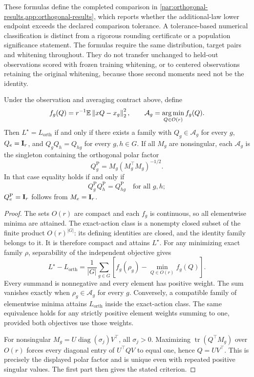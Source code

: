 These formulas define the completed comparison in \cref{par:orthogonal-results,app:orthogonal-results}, which reports whether the additional-law lower endpoint exceeds the declared comparison tolerance. A tolerance-based numerical classification is distinct from a rigorous rounding certificate or a population significance statement. The formulas require the same distribution, target pairs and whitening throughout. They do not transfer unchanged to held-out observations scored with frozen training whitening, or to centered observations retaining the original whitening, because those second moments need not be the identity.

\begin{proposition}
\label{sp:orthogonal-compatibility}
Under the observation and averaging contract above, define
\[
 f_g(Q)=r^{-1}\mathbb E\left\lVert xQ-x_g\right\rVert_2^2,
 \qquad \mathcal A_g=\operatorname*{arg\,min}_{Q\in O(r)}f_g(Q).
\]
Then $L^\star=L_{\mathrm{orth}}$ if and only if there exists a family with
$Q_g\in\mathcal A_g$ for every $g$, $Q_e=\mathbf{I}_r$, and
$Q_gQ_h=Q_{hg}$ for every $g,h\in G$.
If all $M_g$ are nonsingular, each $\mathcal A_g$ is the singleton containing the orthogonal polar factor
\[
 Q_g^{\mathrm P}=M_g(M_g^\top M_g)^{-1/2}.
\]
In that case equality holds if and only if
\[
 Q_g^{\mathrm P}Q_h^{\mathrm P}
 =
 Q_{hg}^{\mathrm P}
 \quad\text{for all }g,h;
\]
$Q_e^{\mathrm P}=\mathbf{I}_r$ follows from $M_e=\mathbf{I}_r$.
\end{proposition}

\begin{proof}
The sets $O(r)$ are compact and each $f_g$ is continuous, so all elementwise minima are attained. The exact-action class is a nonempty closed subset of the finite product $O(r)^{|G|}$: its defining identities are closed, and the identity family belongs to it. It is therefore compact and attains $L^\star$. For any minimizing exact family $\rho$, separability of the independent objective gives
\[
 L^\star-L_{\mathrm{orth}}
 =\frac1{|G|}\sum_{g\in G}
 \left[f_g(\rho_g)-\min_{Q\in O(r)}f_g(Q)\right].
\]
Every summand is nonnegative and every element has positive weight. The sum vanishes exactly when $\rho_g\in\mathcal A_g$ for every $g$. Conversely, a compatible family of elementwise minima attains $L_{\mathrm{orth}}$ inside the exact-action class. The same equivalence holds for any strictly positive element weights summing to one, provided both objectives use those weights.

For nonsingular $M_g=U\operatorname{diag}(\sigma_j)V^\top$, all $\sigma_j>0$. Maximizing $\operatorname{tr}(Q^\top M_g)$ over $O(r)$ forces every diagonal entry of $U^\top QV$ to equal one, hence $Q=UV^\top$. This is precisely the displayed polar factor and is unique even with repeated positive singular values. The first part then gives the stated criterion.
\end{proof}

